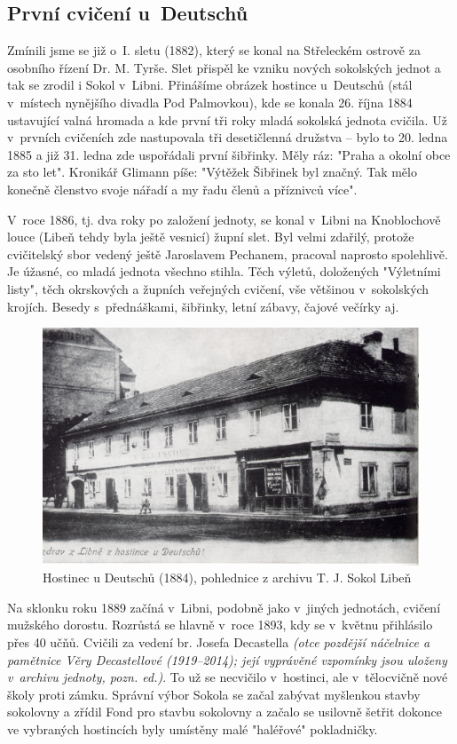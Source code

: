 \documentclass[a5paper, 11pt, twoside]{article}
\newcommand{\pozned}[1]{%
\textit{#1}}
\begin{document}
\subsection{První cvičení u~Deutschů}
Zmínili jsme se již o~I. sletu (1882), který se konal na Střeleckém ostrově za osobního řízení Dr. M. Tyrše. Slet přispěl ke vzniku nových sokolských jednot a tak se zrodil i Sokol v~Libni. Přinášíme obrázek hostince u~Deutschů (stál v~místech nynějšího divadla Pod Palmovkou), kde se konala 26. října 1884 ustavující valná hromada a kde první tři roky mladá sokolská jednota cvičila. Už v~prvních cvičeních zde nastupovala tři desetičlenná družstva – bylo to 20. ledna 1885 a již 31. ledna zde uspořádali první šibřinky. Měly ráz: "Praha a okolní obce za sto let". Kronikář Glimann píše: "Výtěžek Šibřinek byl značný. Tak mělo konečně členstvo svoje nářadí a my řadu členů a příznivců více".

V~roce 1886, tj. dva roky po založení jednoty, se konal v~Libni na Knoblochově louce (Libeň tehdy byla ještě vesnicí) župní slet. Byl velmi zdařilý, protože cvičitelský sbor vedený ještě Jaroslavem Pechanem, pracoval naprosto spolehlivě. Je úžasné, co mladá jednota všechno stihla. Těch výletů, doložených "Výletními listy", těch okrskových a župních veřejných cvičení, vše většinou v~sokolských krojích. Besedy s~přednáškami, šibřinky, letní zábavy, čajové večírky aj.
\begin{figure}[h!]
  \centering
  \includegraphics[width=\textwidth]{img/09_hospoda_u_deutschu.jpg}
  \caption*{Hostinec u Deutschů (1884), pohlednice z archivu T. J.
  Sokol Libeň}
\end{figure}

Na sklonku roku 1889 začíná v~Libni, podobně jako v~jiných jednotách, cvičení mužského dorostu. Rozrůstá se hlavně v~roce 1893, kdy se v~květnu přihlásilo přes 40 učňů. Cvičili za vedení br. Josefa Decastella \pozned{(otce pozdější náčelnice a pamětnice Věry Decastellové (1919–2014); její vyprávěné vzpomínky jsou uloženy v~archivu jednoty, pozn. ed.)}. To už se necvičilo v~hostinci, ale v~tělocvičně nové školy proti zámku. Správní výbor Sokola se začal zabývat myšlenkou stavby sokolovny a zřídil Fond pro stavbu sokolovny a začalo se usilovně šetřit dokonce ve vybraných hostincích byly umístěny malé "haléřové" pokladničky.
\end{document}
